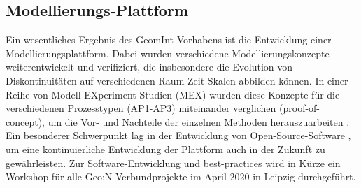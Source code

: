 \subsection*{Modellierungs-Plattform}
\label{sec:mod}

Ein wesentliches Ergebnis des GeomInt-Vorhabens ist die Entwicklung einer Modellierungsplattform. Dabei wurden verschiedene Modellierungskonzepte weiterentwickelt und verifiziert, die insbesondere die Evolution von Diskontinuitäten auf verschiedenen Raum-Zeit-Skalen abbilden können. In einer Reihe von Modell-EXperiment-Studien (MEX) wurden diese Konzepte für die verschiedenen Prozesstypen (AP1-AP3) miteinander verglichen (proof-of-concept), um die Vor- und Nachteile der einzelnen Methoden herauszuarbeiten \cite{Yoshioka2019}.
Ein besonderer Schwerpunkt lag in der Entwicklung von Open-Source-Software \cite{Bilke2019337}, um eine kontinuierliche Entwicklung der Plattform auch in der Zukunft zu gewährleisten. Zur Software-Entwicklung und \glqq best-practices\grqq{} wird in Kürze ein Workshop für alle Geo:N Verbundprojekte im April 2020 in Leipzig durchgeführt.
